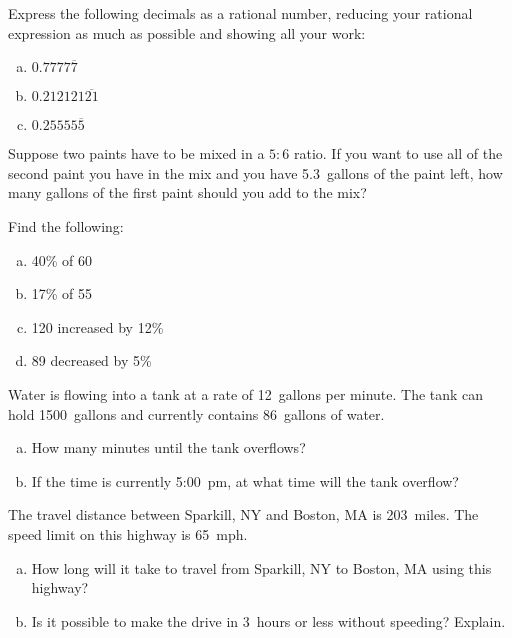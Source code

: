 \documentclass[11pt,letterpaper]{article}
\begin{document}
 Express the following decimals as a rational number, reducing your rational expression as much as possible and showing all your work:
\begin{enumerate}[(a)]
\item $0.7777\overline{7}$ \vfill
\item $0.212121\overline{21}$ \vfill
\item $0.25555\overline{5}$ \vfill
\end{enumerate}



\newpage



 Suppose two paints have to be mixed in a $5 : 6$ ratio. If you want to use all of the second paint you have in the mix and you have 5.3~gallons of the paint left, how many gallons of the first paint should you add to the mix? 



\vspace{5cm}



 Find the following:
\begin{enumerate}[(a)]
\item 40\% of 60 \pvspace{1cm}
\item 17\% of 55 \pvspace{1cm}
\item 120 increased by 12\% \pvspace{1cm}
\item 89 decreased by 5\% \pvspace{1cm}
\end{enumerate} \pspace


 Water is flowing into a tank at a rate of 12~gallons per minute. The tank can hold 1500~gallons and currently contains 86~gallons of water. 
\begin{enumerate}[(a)]
\item How many minutes until the tank overflows? \vfill
\item If the time is currently 5:00~pm, at what time will the tank overflow? \vfill
\end{enumerate}



\newpage



 The travel distance between Sparkill, NY and Boston, MA is 203~miles. The speed limit on this highway is 65~mph. 
\begin{enumerate}[(a)]
\item How long will it take to travel from Sparkill, NY to Boston, MA using this highway? \pvspace{3cm}
\item Is it possible to make the drive in 3~hours or less without speeding? Explain. \pvspace{3cm}
\end{enumerate}
\end{document}
